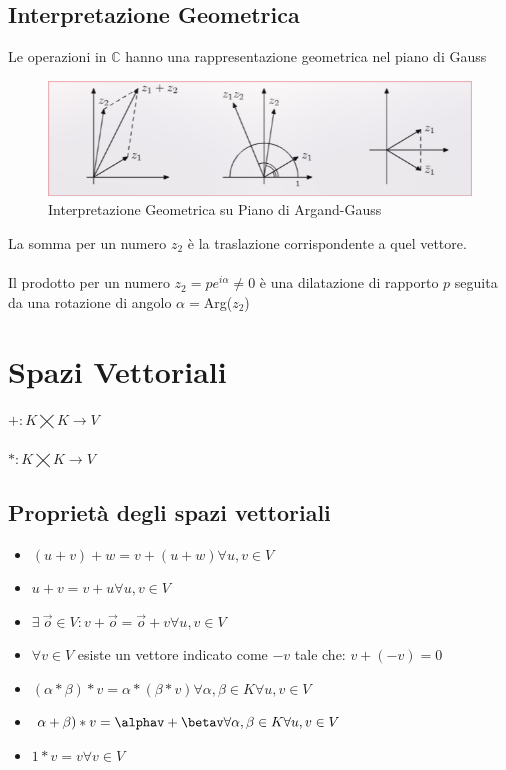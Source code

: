 \documentclass{report}
\begin{document}
\section{Interpretazione Geometrica}
Le operazioni in $\mathbb{C}$ hanno una rappresentazione geometrica nel piano di Gauss
\begin{figure}[h]
 \centering
  \includegraphics[scale=0.5]{img/interpretazioneGeometricaSuPianoDiGauss.png}
  \caption{Interpretazione Geometrica su Piano di Argand-Gauss}
  \label{fig:image}
\end{figure}
La somma per un numero $z_2$ è la traslazione corrispondente a quel vettore. \\ \\
Il prodotto per un numero $z_2 = pe^{i\alpha} \neq 0$ è una dilatazione di rapporto $p$ seguita da una rotazione di angolo $\alpha =$Arg($z_2$)
\chapter{Spazi Vettoriali}
$+ : K \varprod K \rightarrow V$
\\ \\
$* : K \varprod K \rightarrow V$
\section{Proprietà degli spazi vettoriali}
\begin{itemize}
    \item{$(u + v) + w = v + (u + w) \forall u, v \in V$}
    \item{$u + v = v + u \forall u, v \in V$}
    \item{$\exists \ \Vec{o} \in V : v + \Vec{o} = \Vec{o} + v \forall u, v \in V$}
    \item{$\forall v \in V$ esiste un vettore indicato come $-v$ tale che: $v + (-v) = 0$}
    \item{$(\alpha * \beta) * v = \alpha * (\beta * v) \forall \alpha,\beta \in K \forall u, v \in V$}
    \item{$\alpha + \beta) * v = \alphav + \betav \forall \alpha,\beta \in K \forall u, v \in V$}
    \item{$1 * v = v \forall v \in V$}
\end{itemize}
\end{document}
